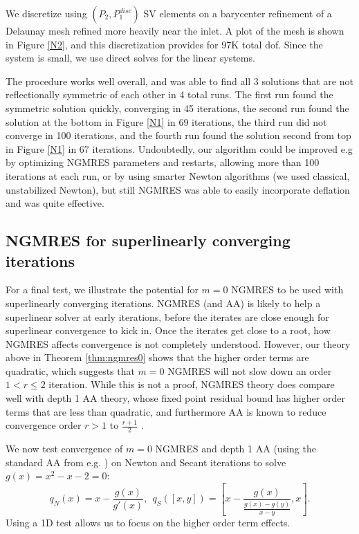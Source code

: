 \documentclass{article}
\numberwithin{equation}{section}
\begin{document}
We discretize using $(P_2,P_1^{disc})$ SV elements on a barycenter refinement of a Delaunay mesh refined more heavily near the inlet.  A plot of the mesh is shown in Figure \ref{N2}, and this discretization provides for 97K total dof.  Since the system is small, we use direct solves for the linear systems.

The procedure works well overall, and was able to find all 3 solutions that are not reflectionally symmetric of each other in 4 total runs.  The first run found the symmetric solution quickly, converging in 45 iterations, the second run found the solution at the bottom in Figure \ref{N1} in 69 iterations, the third run did not converge in 100 iterations, and the fourth run found the solution second from top in Figure \ref{N1} in 67 iterations.  Undoubtedly, our algorithm could be improved e.g by optimizing NGMRES parameters and restarts, allowing more than 100 iterations at each run, or by using smarter Newton algorithms (we used classical, unstabilized Newton), but still NGMRES was able to easily incorporate deflation and was quite effective. 



\subsection{NGMRES for superlinearly converging iterations}
For a final test, we illustrate the potential for $m=0$ NGMRES to be used with superlinearly converging iterations.  NGMRES (and AA) is likely to help a superlinear solver at early iterations, before the iterates are close enough for superlinear convergence to kick in.  Once the iterates get close to a root, how NGMRES affects convergence is not completely understood.  However, our theory above in Theorem \ref{thm:ngmres0} shows that the higher order terms are quadratic, which suggests that $m=0$ NGMRES will not slow down an order $1<r\le 2$ iteration. While this is not a proof, NGMRES theory does compare well with depth 1 AA theory, whose fixed point residual bound has higher order terms that are less than quadratic, and furthermore AA is known to reduce convergence order $r>1$ to $\frac{r+1}{2}$ \cite{X23,RX23}.

We now test convergence of $m=0$ NGMRES and depth 1 AA (using the standard AA from e.g. \cite{PR25}) on Newton and Secant iterations to solve $g(x) = x^2 -x-2 =0$:
\[
q_N(x) =  x - \frac{g(x)}{g'(x)}, \ \  %
q_S([x,y]) = [x - \frac{g(x)}{ \frac{g(x)-g(y)}{x-y}},x].
\]
Using a 1D test allows us to focus on the higher order term effects.
\end{document}
